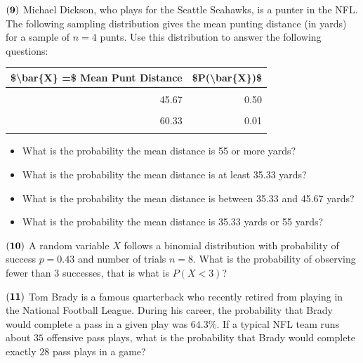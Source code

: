 \documentclass[
]{article}
\providecommand{\tightlist}{%
  \setlength{\itemsep}{0pt}\setlength{\parskip}{0pt}}
\begin{document}
\(\bf (9)\) Michael Dickson, who plays for the Seattle Seahawks, is a
punter in the NFL. The following sampling distribution gives the mean
punting distance (in yards) for a sample of \(n=4\) punts. Use this
distribution to answer the following questions:

\begin{table}[H]
\centering\centering
\begin{tabular}{rr}
\toprule
\$\textbackslash{}bar\{X\} =\$ Mean Punt Distance & \$P(\textbackslash{}bar\{X\})\$\\
\midrule
\cellcolor{gray!10}{35.33} & \cellcolor{gray!10}{0.40}\\
45.67 & 0.50\\
\cellcolor{gray!10}{55.00} & \cellcolor{gray!10}{0.08}\\
60.33 & 0.01\\
\cellcolor{gray!10}{65.67} & \cellcolor{gray!10}{0.01}\\
\bottomrule
\end{tabular}
\end{table}

\begin{itemize}
\tightlist
\item
  What is the probability the mean distance is 55 or more yards?
\end{itemize}

\begin{itemize}
\tightlist
\item
  What is the probability the mean distance is at least 35.33 yards?
\end{itemize}

\begin{itemize}
\tightlist
\item
  What is the probability the mean distance is between 35.33 and 45.67
  yards?
\end{itemize}

\begin{itemize}
\tightlist
\item
  What is the probability the mean distance is 35.33 yards or 55 yards?
\end{itemize}

\(\bf (10)\) A random variable \(X\) follows a binomial distribution
with probability of success \(p = 0.43\) and number of trials \(n = 8\).
What is the probability of observing fewer than 3 successes, that is
what is \(P(X < 3)\)?

\(\bf (11)\) Tom Brady is a famous quarterback who recently retired from
playing in the National Football League. During his career, the
probability that Brady would complete a pass in a given play was
\(64.3\%\). If a typical NFL team runs about \(35\) offensive pass
plays, what is the probability that Brady would complete exactly \(28\)
pass plays in a game?
\end{document}
